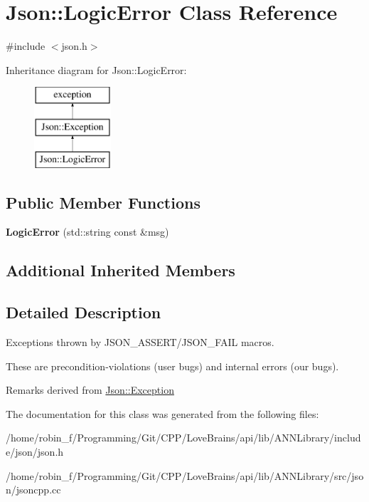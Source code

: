\hypertarget{class_json_1_1_logic_error}{}\section{Json\+:\+:Logic\+Error Class Reference}
\label{class_json_1_1_logic_error}


{\ttfamily \#include $<$json.\+h$>$}

Inheritance diagram for Json\+:\+:Logic\+Error\+:\begin{figure}[H]
\begin{center}
\leavevmode
\includegraphics[height=3.000000cm]{class_json_1_1_logic_error}
\end{center}
\end{figure}
\subsection*{Public Member Functions}
\begin{DoxyCompactItemize}
\item 
\hypertarget{class_json_1_1_logic_error_ae8a834c790017a55df74c70b91f23329}{}{\bfseries Logic\+Error} (std\+::string const \&msg)\label{class_json_1_1_logic_error_ae8a834c790017a55df74c70b91f23329}

\end{DoxyCompactItemize}
\subsection*{Additional Inherited Members}


\subsection{Detailed Description}
Exceptions thrown by J\+S\+O\+N\+\_\+\+A\+S\+S\+E\+R\+T/\+J\+S\+O\+N\+\_\+\+F\+A\+I\+L macros.

These are precondition-\/violations (user bugs) and internal errors (our bugs).

\begin{DoxyRemark}{Remarks}
derived from \hyperlink{class_json_1_1_exception}{Json\+::\+Exception} 
\end{DoxyRemark}


The documentation for this class was generated from the following files\+:\begin{DoxyCompactItemize}
\item 
/home/robin\+\_\+f/\+Programming/\+Git/\+C\+P\+P/\+Love\+Brains/api/lib/\+A\+N\+N\+Library/include/json/json.\+h\item 
/home/robin\+\_\+f/\+Programming/\+Git/\+C\+P\+P/\+Love\+Brains/api/lib/\+A\+N\+N\+Library/src/json/jsoncpp.\+cc\end{DoxyCompactItemize}
